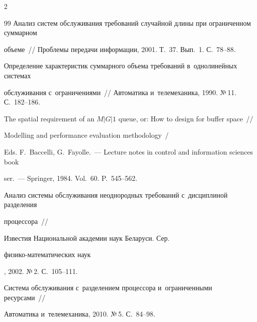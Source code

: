 \begin{multicols}{2}
{{\begin{thebibliography}{99}
Анализ сис\-тем обслуживания требований случайной длины при ограниченном суммарном 


объеме~// {Проб\-ле\-мы передачи информации}, 2001. Т.~37. Вып.~1. С.~78--88.











Определение характеристик суммарного объема требований в~однолинейных сис\-те\-мах 


обслуживания с~ограничениями~// {Автоматика и~телемеханика}, 1990. №\,11. С.~182--186.











The spatial requirement of an $M|G|1$ queue, or: How to design for buffer space~// 


{Modelling and performance evaluation methodology}~/


Eds. F.~Baccelli, G.~Fayolle.~--- Lecture notes in control and information sciences book


ser.~--- Springer, 1984. Vol.~60. P.~545--562.











Анализ сис\-те\-мы обслуживания неоднородных требований с~дисциплиной разделения 


процессора~// {Известия Национальной академии наук Беларуси. Сер. 


фи\-зи\-ко-ма\-те\-ма\-ти\-че\-ских наук}, 2002. №\,2. С.~105--111.











Система обслуживания с~разделением процессора и~ограниченными ресурсами~// 


{Автоматика и~телемеханика}, 2010. №\,5. С.~84--98.






\end{thebibliography}}}
\end{multicols}
